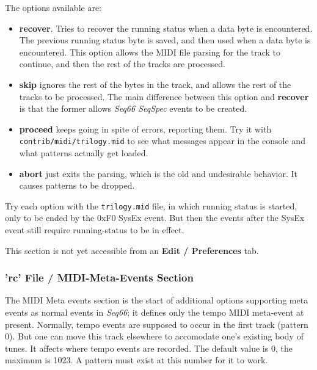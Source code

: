    The options available are:

   \begin{itemize}
      \item \textbf{recover}. Tries to recover the running status when a data
         byte is encountered. The previous running status byte is saved, and
         then used when a data byte is encountered.
         This option allows the MIDI file parsing for the track to continue,
         and then the rest of the tracks are processed.
      \item \textbf{skip} ignores the rest of the bytes in the track, and
         allows the rest of the tracks to be processed.
         The main difference between this option and \textbf{recover} is
         that the former allows \textsl{Seq66 SeqSpec} events to be created.
      \item \textbf{proceed} keeps going in spite of errors, reporting them.
         Try it with \texttt{contrib/midi/trilogy.mid} to see what messages
         appear in the console and what patterns actually get loaded.
      \item \textbf{abort} just exits the parsing, which is the old
         and undesirable behavior.
         It causes patterns to be dropped.
   \end{itemize}

   Try each option with the \texttt{trilogy.mid} file, in which running
   status is started, only to be ended by the 0xF0 SysEx event.
   But then the events after the SysEx event still require running-status
   to be in effect.

   This section is not yet accessible from an
   \textbf{Edit / Preferences} tab.

\subsubsection{'rc' File / MIDI-Meta-Events Section}
\label{subsubsec:configuration_rc_midi_meta_events}

   The MIDI Meta events section is the start of additional options
   supporting meta events as normal events in \textsl{Seq66};
   it defines only the tempo MIDI meta-event at present.
   Normally, tempo events are supposed to occur in the first track (pattern 0).
   But one can move this track elsewhere to accomodate one's existing body of
   tunes.  It affects where tempo events are recorded.  The default value is 0,
   the maximum is 1023.  A pattern must exist at this number for it to work.

